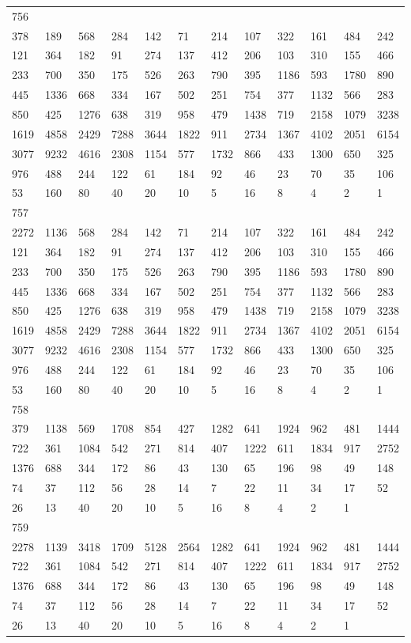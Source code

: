\begin{longtable}{llllllllllll}
756&&&&&&&&&&&\\
378& 189& 568& 284& 142& 71& 214& 107& 322& 161& 484& 242\\
121& 364& 182& 91& 274& 137& 412& 206& 103& 310& 155& 466\\
233& 700& 350& 175& 526& 263& 790& 395& 1186& 593& 1780& 890\\
445& 1336& 668& 334& 167& 502& 251& 754& 377& 1132& 566& 283\\
850& 425& 1276& 638& 319& 958& 479& 1438& 719& 2158& 1079& 3238\\
1619& 4858& 2429& 7288& 3644& 1822& 911& 2734& 1367& 4102& 2051& 6154\\
3077& 9232& 4616& 2308& 1154& 577& 1732& 866& 433& 1300& 650& 325\\
976& 488& 244& 122& 61& 184& 92& 46& 23& 70& 35& 106\\
53& 160& 80& 40& 20& 10& 5& 16& 8& 4& 2& 1\\

757&&&&&&&&&&&\\
2272& 1136& 568& 284& 142& 71& 214& 107& 322& 161& 484& 242\\
121& 364& 182& 91& 274& 137& 412& 206& 103& 310& 155& 466\\
233& 700& 350& 175& 526& 263& 790& 395& 1186& 593& 1780& 890\\
445& 1336& 668& 334& 167& 502& 251& 754& 377& 1132& 566& 283\\
850& 425& 1276& 638& 319& 958& 479& 1438& 719& 2158& 1079& 3238\\
1619& 4858& 2429& 7288& 3644& 1822& 911& 2734& 1367& 4102& 2051& 6154\\
3077& 9232& 4616& 2308& 1154& 577& 1732& 866& 433& 1300& 650& 325\\
976& 488& 244& 122& 61& 184& 92& 46& 23& 70& 35& 106\\
53& 160& 80& 40& 20& 10& 5& 16& 8& 4& 2& 1\\

758&&&&&&&&&&&\\
379& 1138& 569& 1708& 854& 427& 1282& 641& 1924& 962& 481& 1444\\
722& 361& 1084& 542& 271& 814& 407& 1222& 611& 1834& 917& 2752\\
1376& 688& 344& 172& 86& 43& 130& 65& 196& 98& 49& 148\\
74& 37& 112& 56& 28& 14& 7& 22& 11& 34& 17& 52\\
26& 13& 40& 20& 10& 5& 16& 8& 4& 2& 1& \\

759&&&&&&&&&&&\\
2278& 1139& 3418& 1709& 5128& 2564& 1282& 641& 1924& 962& 481& 1444\\
722& 361& 1084& 542& 271& 814& 407& 1222& 611& 1834& 917& 2752\\
1376& 688& 344& 172& 86& 43& 130& 65& 196& 98& 49& 148\\
74& 37& 112& 56& 28& 14& 7& 22& 11& 34& 17& 52\\
26& 13& 40& 20& 10& 5& 16& 8& 4& 2& 1& \\


\end{longtable}
